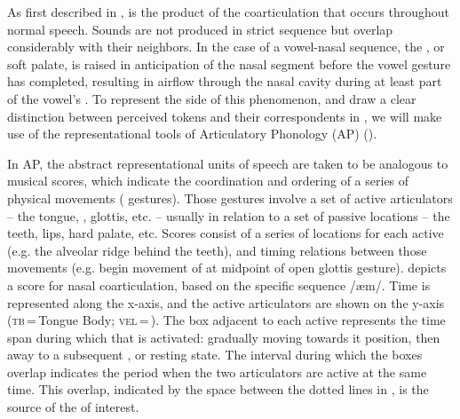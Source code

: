 As first described in ,
  is the product of the coarticulation that
occurs throughout normal speech. Sounds are not produced in strict
sequence but overlap considerably with their neighbors. In the case
of a vowel-nasal sequence, the , or soft palate, is raised in
anticipation of the nasal segment before the vowel gesture has completed,
resulting in airflow through the nasal cavity during at least part
of the vowel's . To represent the  side of this
phenomenon, and draw a clear distinction between perceived tokens
and their correspondents in , we will make use of the representational
tools of Articulatory Phonology (AP) (\citealt{Browman1986,Browman1990}). 

In AP, the abstract representational units of speech are taken to
be analogous to musical scores, which indicate the coordination and
ordering of a series of physical movements ( gestures).
Those gestures involve a set of active articulators – the tongue,
, glottis, etc. – usually in relation to a set of passive 
locations – the teeth, lips, hard palate, etc. Scores consist of a
series of  locations for each active  (e.g. the
alveolar ridge behind the teeth), and timing relations between those
movements (e.g. begin movement of  at midpoint of open
glottis gesture).  depicts a 
score for nasal coarticulation, based on the specific sequence {/æm/}.
Time is represented along the x-axis, and the active articulators
are shown on the y-axis ({\scshape tb}\,=\,Tongue Body; {\scshape vel}\,=\,). The box adjacent
to each active  represents the time span during which that
 is activated: gradually moving towards it  position,
then away to a subsequent , or resting state. The interval during
which the boxes overlap indicates the period when the two articulators
are active at the same time. This overlap, indicated by the space
between the dotted lines in , is
the source of the  of interest. 

